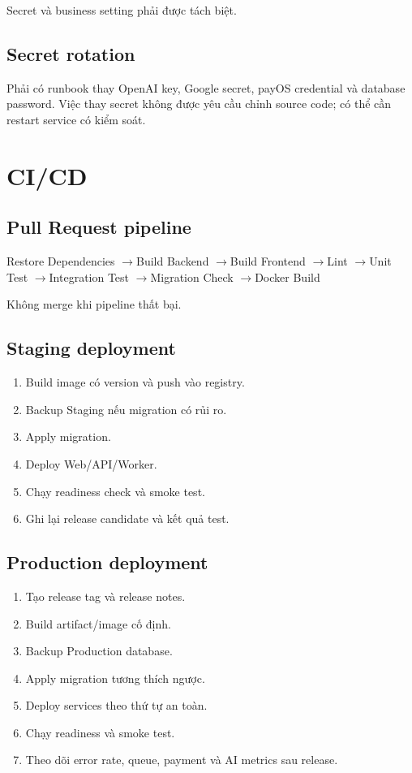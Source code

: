 \documentclass[11pt,a4paper]{article}
\newcommand{\arrow}{\ensuremath{\rightarrow}}
\begin{document}
Secret và business setting phải được tách biệt.

\subsection{Secret rotation}

Phải có runbook thay OpenAI key, Google secret, payOS credential và database password. Việc thay secret không được yêu cầu chỉnh source code; có thể cần restart service có kiểm soát.

\section{CI/CD}

\subsection{Pull Request pipeline}

\begin{flowbox}
Restore Dependencies \arrow Build Backend \arrow Build Frontend \arrow Lint \arrow Unit Test \arrow Integration Test \arrow Migration Check \arrow Docker Build
\end{flowbox}

Không merge khi pipeline thất bại.

\subsection{Staging deployment}

\begin{enumerate}
  \item Build image có version và push vào registry.
  \item Backup Staging nếu migration có rủi ro.
  \item Apply migration.
  \item Deploy Web/API/Worker.
  \item Chạy readiness check và smoke test.
  \item Ghi lại release candidate và kết quả test.
\end{enumerate}

\subsection{Production deployment}

\begin{enumerate}
  \item Tạo release tag và release notes.
  \item Build artifact/image cố định.
  \item Backup Production database.
  \item Apply migration tương thích ngược.
  \item Deploy services theo thứ tự an toàn.
  \item Chạy readiness và smoke test.
  \item Theo dõi error rate, queue, payment và AI metrics sau release.
\end{enumerate}
\end{document}

